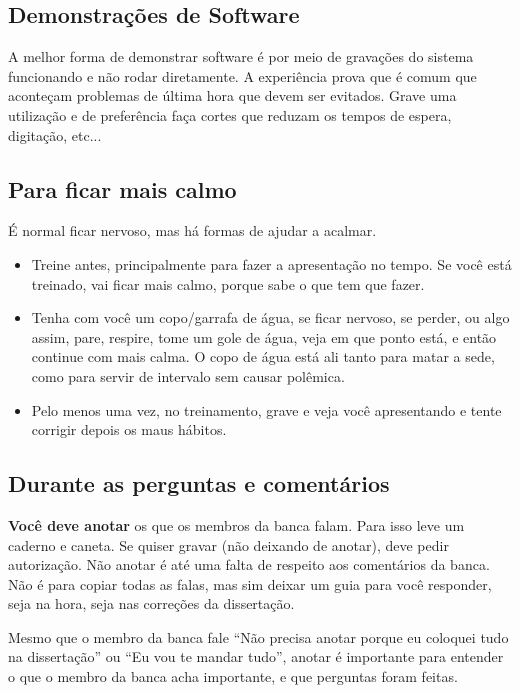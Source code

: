 \subsection{Demonstrações de Software}

A melhor forma de demonstrar software é por meio de gravações do sistema funcionando e não rodar diretamente. A experiência prova que é comum que aconteçam problemas de última hora que devem ser evitados. Grave uma utilização e de preferência faça cortes que reduzam os tempos de espera, digitação, etc...

\subsection{Para ficar mais calmo}

É normal ficar nervoso, mas há formas de ajudar a acalmar.
\begin{itemize}
    \item Treine antes, principalmente para fazer a apresentação no tempo. Se você está treinado, vai ficar mais calmo, porque sabe o que tem que fazer.
    \item Tenha com você um copo/garrafa de água, se ficar nervoso, se perder, ou algo assim, pare, respire, tome um gole de água, veja em que ponto está, e então continue com mais calma. O copo de água está ali tanto para matar a sede, como para servir de intervalo sem causar polêmica.
    \item Pelo menos uma vez, no treinamento, grave e veja você apresentando e tente corrigir depois os maus hábitos.
\end{itemize}

\subsection{Durante as perguntas e comentários}

\textbf{Você deve anotar} os que os membros da banca falam. Para isso leve um caderno e caneta. Se quiser gravar (não deixando de anotar), deve pedir autorização. Não anotar é até uma falta de respeito aos comentários da banca. Não é para copiar todas as falas, mas sim deixar um guia para você responder, seja na hora, seja nas correções da dissertação.

Mesmo que o membro da banca fale ``Não precisa anotar porque eu coloquei tudo na dissertação'' ou ``Eu vou te mandar tudo'', anotar é importante para entender o que o membro da banca acha importante, e que perguntas foram feitas.

